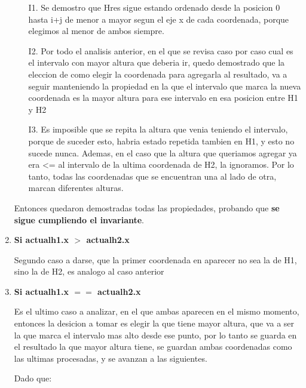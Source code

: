 \begin{enumerate}
\begin{itemize}
\item[I1.] Se demostro que Hres sigue estando ordenado desde la posicion 0 hasta i+j de menor a mayor segun el eje x de cada coordenada, porque elegimos al menor de ambos siempre.
\item[I2.] Por todo el analisis anterior, en el que se revisa caso por caso cual es el intervalo con mayor altura que deberia ir, quedo demostrado que la eleccion de como elegir la coordenada para agregarla al resultado, va a seguir manteniendo la propiedad en la que el intervalo que marca la nueva coordenada es la mayor altura para ese intervalo en esa posicion entre H1 y H2
\item[I3.] Es imposible que se repita la altura que venia teniendo el intervalo, porque de suceder esto, habria estado repetida tambien en H1, y esto no sucede nunca. Ademas, en el caso que la altura que queriamos agregar ya era <= al intervalo de la ultima coordenada de H2, la ignoramos. Por lo tanto, todas las coordenadas que se encuentran una al lado de otra, marcan diferentes alturas.
\end{itemize}

Entonces quedaron demostradas todas las propiedades, probando que \textbf{se sigue cumpliendo el invariante}.\\

\item \textbf{Si actualh1.x $>$ actualh2.x}

Segundo caso a darse, que la primer coordenada en aparecer no sea la de H1, sino la de H2, es analogo al caso anterior\\

\item \textbf{Si actualh1.x $==$ actualh2.x}

Es el ultimo caso a analizar, en el que ambas aparecen en el mismo momento, entonces la desicion a tomar es elegir la que tiene mayor altura, que va a ser la que marca el intervalo mas alto desde ese punto, por lo tanto se guarda en el resultado la que mayor altura tiene, se guardan ambas coordenadas como las ultimas procesadas, y se avanzan a las siguientes. 

Dado que:


\end{enumerate}
